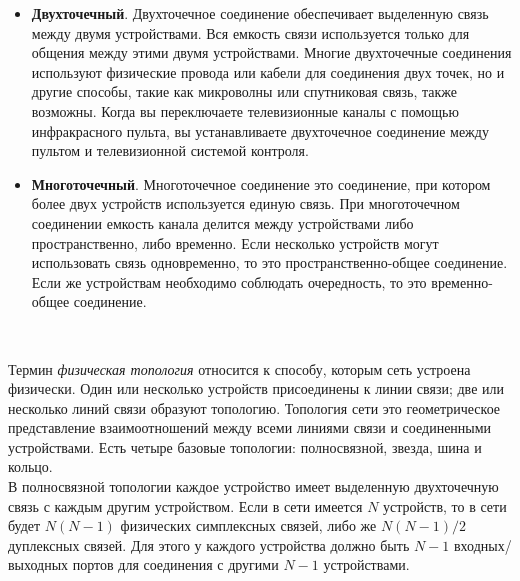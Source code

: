 \begin{itemize}
  \item \textbf{Двухточечный}. Двухточечное соединение обеспечивает выделенную связь между двумя устройствами. Вся емкость связи используется только для общения между этими двумя устройствами. Многие двухточечные соединения используют физические провода или кабели для соединения двух точек, но и другие способы, такие как микроволны или спутниковая связь, также возможны. Когда вы переключаете телевизионные каналы с помощью инфракрасного пульта, вы устанавливаете двухточечное соединение между пультом и телевизионной системой контроля.
  \item \textbf{Многоточечный}. Многоточечное соединение это соединение, при котором более двух устройств используется единую связь. При многоточечном соединении емкость канала делится между устройствами либо пространственно, либо временно. Если несколько устройств могут использовать связь одновременно, то это пространственно-общее соединение. Если же устройствам необходимо соблюдать очередность, то это временно-общее соединение.
\end{itemize}
\

Термин \textit{физическая топология} относится к способу, которым сеть устроена физически. Один или несколько устройств присоединены к линии связи; две или несколько линий связи образуют топологию. Топология сети это геометрическое представление взаимоотношений между всеми линиями связи и соединенными устройствами. Есть четыре базовые топологии: полносвязной, звезда, шина и кольцо. \\

В полносвязной топологии каждое устройство имеет выделенную двухточечную связь с каждым другим устройством. Если в сети имеется $N$ устройств, то в сети будет $N(N-1)$ физических симплексных связей, либо же $N(N-1)/2$ дуплексных связей. Для этого у каждого устройства должно быть $N-1$ входных/выходных портов для соединения с другими $N-1$ устройствами. \\

\

